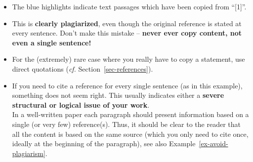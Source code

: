 \documentclass[11pt,a4paper]{article}
\begin{document}
\begin{badexample}
  \label{ex-plagiat1}
  \begin{figure}[H]
    \centering%
    {%
      \setlength{\fboxsep}{0pt}%
      \setlength{\fboxrule}{2pt}%
    }
  \end{figure}
  \begin{itemize}
    \item The blue highlights indicate text passages which have been copied from ``[1]''.
    \item This is \textbf{clearly plagiarized}, even though the original reference is stated at every sentence.
    Don't make this mistake -- \textbf{never ever copy content, not even a single sentence!}
    \item For the (extremely) rare case where you really have to copy a statement, use direct quotations (\emph{cf.} Section~\ref{sec-references}).
    \item If you need to cite a reference for every single sentence (as in this example), something does not seem right. This usually indicates either a \textbf{severe structural or logical issue of your work}.\\In a well-written paper each paragraph should present information based on a single (or very few) reference(s). Thus, it should be clear to the reader that all the content is based on the same source (which you only need to cite once, ideally at the beginning of the paragraph), see also Example~\ref{ex-avoid-plagiarism}.
  \end{itemize}
\end{badexample}
\end{document}
